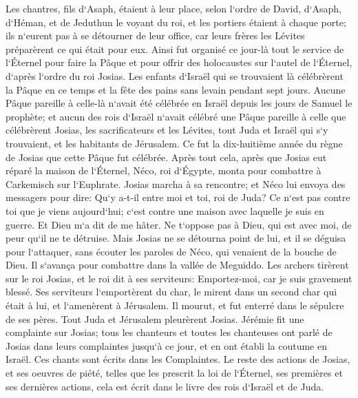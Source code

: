 \verse Les chantres, fils d`Asaph, étaient à leur place, selon l`ordre de David, d`Asaph, d`Héman, et de Jeduthun le voyant du roi, et les portiers étaient à chaque porte; ils n`eurent pas à se détourner de leur office, car leurs frères les Lévites préparèrent ce qui était pour eux. 
\verse Ainsi fut organisé ce jour-là tout le service de l`Éternel pour faire la Pâque et pour offrir des holocaustes sur l`autel de l`Éternel, d`après l`ordre du roi Josias. 
\verse Les enfants d`Israël qui se trouvaient là célébrèrent la Pâque en ce temps et la fête des pains sans levain pendant sept jours. 
\verse Aucune Pâque pareille à celle-là n`avait été célébrée en Israël depuis les jours de Samuel le prophète; et aucun des rois d`Israël n`avait célébré une Pâque pareille à celle que célébrèrent Josias, les sacrificateurs et les Lévites, tout Juda et Israël qui s`y trouvaient, et les habitants de Jérusalem. 
\verse Ce fut la dix-huitième année du règne de Josias que cette Pâque fut célébrée. 
\verse Après tout cela, après que Josias eut réparé la maison de l`Éternel, Néco, roi d`Égypte, monta pour combattre à Carkemisch sur l`Euphrate. Josias marcha à sa rencontre; 
\verse et Néco lui envoya des messagers pour dire: Qu`y a-t-il entre moi et toi, roi de Juda? Ce n`est pas contre toi que je viens aujourd`hui; c`est contre une maison avec laquelle je suis en guerre. Et Dieu m`a dit de me hâter. Ne t`oppose pas à Dieu, qui est avec moi, de peur qu`il ne te détruise. 
\verse Mais Josias ne se détourna point de lui, et il se déguisa pour l`attaquer, sans écouter les paroles de Néco, qui venaient de la bouche de Dieu. Il s`avança pour combattre dans la vallée de Meguiddo. 
\verse Les archers tirèrent sur le roi Josias, et le roi dit à ses serviteurs: Emportez-moi, car je suis gravement blessé. 
\verse Ses serviteurs l`emportèrent du char, le mirent dans un second char qui était à lui, et l`amenèrent à Jérusalem. Il mourut, et fut enterré dans le sépulcre de ses pères. Tout Juda et Jérusalem pleurèrent Josias. 
\verse Jérémie fit une complainte sur Josias; tous les chanteurs et toutes les chanteuses ont parlé de Josias dans leurs complaintes jusqu`à ce jour, et en ont établi la coutume en Israël. Ces chants sont écrits dans les Complaintes. 
\verse Le reste des actions de Josias, et ses oeuvres de piété, telles que les prescrit la loi de l`Éternel, 
\verse ses premières et ses dernières actions, cela est écrit dans le livre des rois d`Israël et de Juda. 

